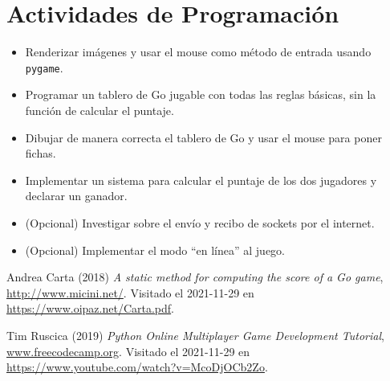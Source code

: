 \documentclass[10pt,letterpaper]{article}
\theoremstyle{definition}
\begin{document}
\section{Actividades de Programaci\'on}

\begin{itemize}
    \item Renderizar im\'agenes y usar el mouse como m\'etodo de entrada usando \verb|pygame|.

    \item Programar un tablero de Go jugable con todas las reglas b\'asicas, sin la funci\'on de calcular el puntaje.

    \item Dibujar de manera correcta el tablero de Go y usar el mouse para poner fichas.

    \item Implementar un sistema para calcular el puntaje de los dos jugadores y declarar un ganador. \cite{scoreGo}

    \item (Opcional) Investigar sobre el env\'io y recibo de sockets por el internet. \cite{multijugador}

    \item (Opcional) Implementar el modo ``en l\'inea'' al juego.
\end{itemize}

\begin{thebibliography}{9}
    Andrea Carta (2018) \emph{A static method for computing the score of a Go game}, \href{http://www.micini.net/}{http://www.micini.net/}. Visitado el 2021-11-29 en \href{https://www.oipaz.net/Carta.pdf}{https://www.oipaz.net/Carta.pdf}.

    Tim Ruscica (2019) \emph{Python Online Multiplayer Game Development Tutorial}, \href{https://www.freecodecamp.org/}{www.freecodecamp.org}. Visitado el 2021-11-29 en \href{https://www.youtube.com/watch?v=McoDjOCb2Zo}{https://www.youtube.com/watch?v=McoDjOCb2Zo}.
\end{thebibliography}
\end{document}

